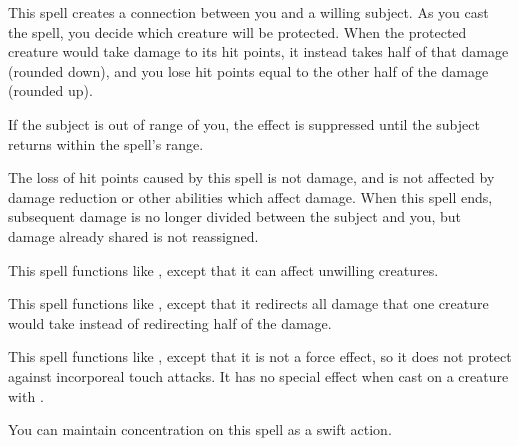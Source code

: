 \spellrng{\rngmed}
\begin{spelleffect}
  This spell creates a connection between you and a willing subject. As you cast the spell, you decide which creature will be protected. When the protected creature would take damage to its hit points, it instead takes half of that damage (rounded down), and you lose hit points equal to the other half of the damage (rounded up).

  If the subject is out of range of you, the effect is suppressed until the subject returns within the spell's range.
\end{spelleffect}
\begin{spellnotes}
  The loss of hit points caused by this spell is not damage, and is not affected by damage reduction or other abilities which affect damage. When this spell ends, subsequent damage is no longer divided between the subject and you, but damage already shared is not reassigned.
\end{spellnotes}

\begin{spelleffect}
  This spell functions like , except that it can affect unwilling creatures. 
\end{spelleffect}

\begin{spelleffect}
  This spell functions like , except that it redirects all damage that one creature would take instead of redirecting half of the damage.
\end{spelleffect}

\begin{spelleffect}
  This spell functions like , except that it is not a force effect, so it does not protect against incorporeal touch attacks. It has no special effect when cast on a creature with .
\end{spelleffect}
\begin{spelleffect}
  You can maintain concentration on this spell as a swift action.
\end{spelleffect}

